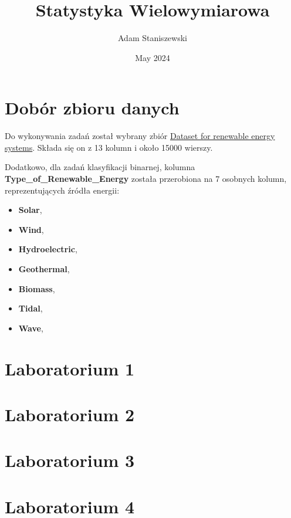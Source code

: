 \documentclass{article}
\title{Statystyka Wielowymiarowa}
\author{Adam Staniszewski}
\date{May 2024}
\begin{document}
\maketitle

\tableofcontents  %

\section{Dobór zbioru danych}
Do wykonywania zadań został wybrany zbiór \href{https://www.kaggle.com/datasets/girumwondemagegn/dataset-for-renewable-energy-systems}{Dataset for renewable energy systems}. Składa się on z 13 kolumn i około 15000 wierszy. 

Dodatkowo, dla zadań klasyfikacji binarnej, kolumna \textbf{Type\_of\_Renewable\_Energy} została przerobiona na 7 osobnych kolumn, reprezentujących źródła energii:
\begin{itemize}
    \item \textbf{Solar},
    \item \textbf{Wind},
    \item \textbf{Hydroelectric},
    \item \textbf{Geothermal},
    \item \textbf{Biomass},
    \item \textbf{Tidal},
    \item \textbf{Wave},
\end{itemize}

\section{Laboratorium 1}


\section{Laboratorium 2}


\section{Laboratorium 3}


\section{Laboratorium 4}

\end{document}
